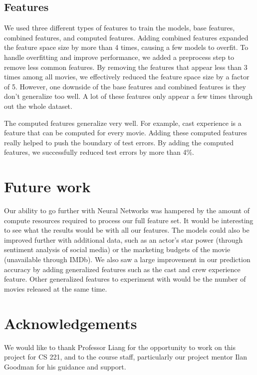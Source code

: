 \documentclass[journal]{IEEEtran}
\begin{document}
\subsection{Features}

We used three different types of features to train the models, base features, combined features, and computed features. Adding combined features expanded the feature space size by more than 4 times, causing a few models to overfit. To handle overfitting and improve performance, we added a preprocess step to remove less common features. By removing the features that appear less than 3 times among all movies, we effectively reduced the feature space size by a factor of 5. However, one downside of the base features and combined features is they don't generalize too well. A lot of these features only appear a few times through out the whole dataset.

\par The computed features generalize very well. For example, cast experience is a feature that can be computed for every movie. Adding these computed features really helped to push the boundary of test errors. By adding the computed features, we successfully reduced test errors by more than 4\%.

\section{Future work}
Our ability to go further with Neural Networks was hampered by the amount of
compute resources required to process our full feature set. It would be
interesting to see what the results would be with all our features. The models
could also be improved further with additional data, such as an actor's star
power (through sentiment analysis of social media) or the marketing budgets of
the movie (unavailable through IMDb). We also saw a large improvement in our
prediction accuracy by adding generalized features such as the cast and crew
experience feature. Other generalized features to experiment with would be the
number of movies released at the same time.

\section{Acknowledgements}
We would like to thank Professor Liang for the opportunity to work on this
project for CS 221, and to the course staff, particularly our project mentor
Ilan Goodman for his guidance and support.
\end{document}
